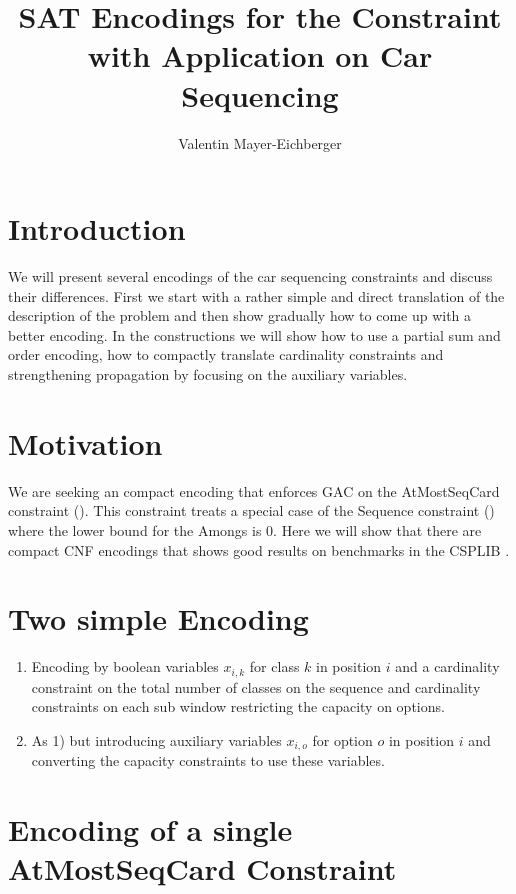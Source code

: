 \documentclass[]{llncs}
\author{Valentin Mayer-Eichberger}
\institute{NICTA \\ University of New South Wales \\
\email{valentin.mayer-eichberger@nicta.com.au}}
\title{SAT Encodings for the \AtMostSeqCard Constraint with Application
on Car Sequencing}
\newcommand{\AtMostSeqCard}{AtMostSeqCard }
\begin{document}
 \maketitle

\section{Introduction}

We will present several encodings of the car sequencing constraints and
discuss their differences. First we start with a rather simple and
direct translation of the description of the problem and then  show
gradually how to come up with a better encoding. In the constructions we
will show how to use a partial sum and order encoding, how to compactly
translate cardinality constraints and strengthening propagation by
focusing on the auxiliary variables. 

\section{Motivation}

We are seeking an compact encoding that enforces GAC on the
\AtMostSeqCard constraint (\cite{Siala12}). This constraint treats a
special case of the Sequence constraint (\cite{Hoeve06}) where the lower
bound for the Amongs is $0$.  Here we will show that there are compact
CNF encodings that shows good results on benchmarks in the CSPLIB
\cite{Gent99}. 

\section{Two simple Encoding}

\begin{enumerate}
    \item Encoding by boolean variables $x_{i,k}$ for class $k$ in position $i$ and
        a cardinality constraint on the total number of classes on the
        sequence and cardinality constraints on each sub window
        restricting the capacity on options. 
    \item As 1) but introducing auxiliary variables $x_{i,o}$ for option
        $o$ in position $i$ and converting the capacity constraints to
        use these variables. 
\end{enumerate}


\section{Encoding of a single \AtMostSeqCard Constraint}
\end{document}
